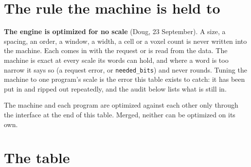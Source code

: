 \section{\texorpdfstring{The rule the machine is held to}{The rule the machine is held to}}

\textbf{The engine is optimized for no scale} (Doug, 23 September). A size, a spacing, an order, a window, a width, a cell or a voxel count is never written into the machine. Each comes in with the request or is read from the data. The machine is exact at every scale its words can hold, and where a word is too narrow it says so (a request error, or \texttt{needed\_\allowbreak{}bits}) and never rounds. Tuning the machine to one program's scale is the error this table exists to catch: it has been put in and ripped out repeatedly, and the audit below lists what is still in.

The machine and each program are optimized against each other only through the interface at the end of this table. Merged, neither can be optimized on its own.

\section{\texorpdfstring{The table}{The table}}

